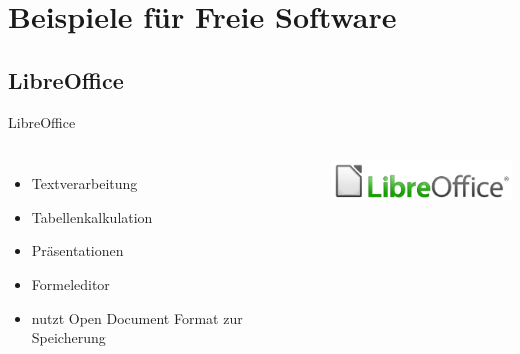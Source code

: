 \documentclass[12pt]{beamer}
\begin{document}
\section{Beispiele für Freie Software}


\subsection{LibreOffice}
\begin{frame}{LibreOffice}

\begin{columns}


\column{6cm}
\begin{itemize}
\item Textverarbeitung
\item Tabellenkalkulation
\item Präsentationen
\item Formeleditor
\item nutzt Open Document Format zur Speicherung
\end{itemize}

\column{5cm}


\begin{center}
\includegraphics[width=5cm]{img/LibreOffice}
\par\end{center}

\end{columns}
\end{frame}
\end{document}

